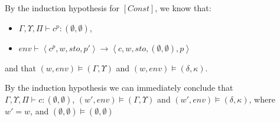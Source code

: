 \item[\runa{Cons}] By the induction hypothesis for $[Const]$, we know that:
			\begin{itemize}
				\item $\Gamma,\Upsilon,\Pi\vdash c^p :(\emptyset,\emptyset)$,
				\item $env\vdash\left\langle c^p,w,sto,p'\right\rangle\rightarrow\left\langle c,w,sto,(\emptyset,\emptyset),p\right\rangle$
			\end{itemize}
			and that $(w,env)\models(\Gamma,\Upsilon)$ and $(w,env)\models(\delta,\kappa)$.

			By the induction hypothesis we can immediately conclude that $\Gamma,\Upsilon,\Pi\vdash c:(\emptyset,\emptyset)$, $(w',env)\models(\Gamma,\Upsilon)$ and $(w',env)\models(\delta,\kappa)$, where $w'=w$, and $(\emptyset,\emptyset)\models(\emptyset,\emptyset)$

